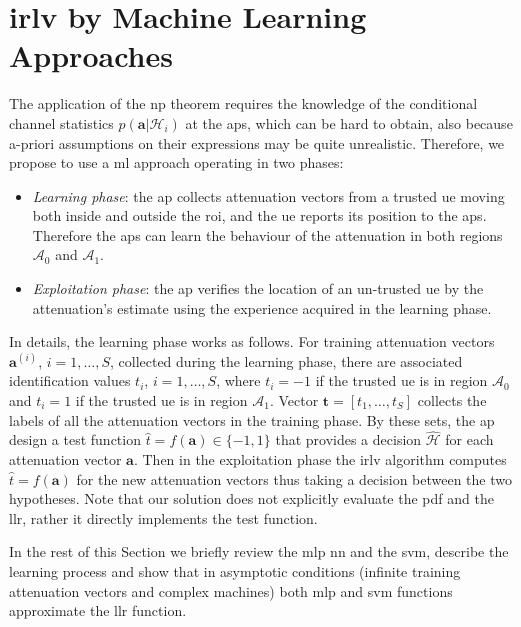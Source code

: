 \documentclass[draftcls,onecolumn,12pt]{IEEEtran}
\newcommand{\ai}{\bm{a}^{(i)}}
\begin{document}
\section{\Ac{irlv} by Machine Learning Approaches}


The application of the \ac{np} theorem requires the knowledge of the conditional channel statistics $p(\bm{a}|\mathcal{H}_i)$ at the \acp{ap}, which can be hard to obtain, also because a-priori assumptions on their expressions may be quite unrealistic. 
 Therefore, we propose to use a \ac{ml} approach operating in two phases:
\begin{itemize}
    \item {\em Learning phase}: the \ac{ap} collects attenuation vectors from a trusted \ac{ue} moving both inside and outside the \ac{roi}, and the \ac{ue} reports its position to the \acp{ap}. Therefore the \acp{ap} can learn the behaviour of the attenuation in both regions $\mathcal A_0$ and $\mathcal A_1$.
    \item {\em Exploitation phase}: the \ac{ap} verifies the location of an un-trusted \ac{ue} by the attenuation's estimate using the experience acquired in the learning phase. 
\end{itemize}

In details, the learning phase works as follows. For training attenuation vectors $\ai$,  $i=1, \ldots, S$,  collected during the learning phase, there are associated identification values $t_i$, $i=1, \ldots, S$, where $t_i= -1$ if the trusted \ac{ue} is in region $\mathcal{A}_0$ and $t_i = 1$ if the trusted \ac{ue} is in region $\mathcal{A}_1$. Vector $\bm{t}=[t_1, \ldots, t_S]$ collects the labels of all the  attenuation vectors in the training phase. By these sets, the \ac{ap} design a test function  $\hat{t} = f(\bm{a})\in \{-1, 1\}$ that provides a decision $\hat{\mathcal H}$ for each attenuation vector $\bm{a}$. Then in the exploitation phase the \ac{irlv} algorithm computes $\hat{t} = f(\bm{a})$ for the new attenuation vectors thus taking a decision between the two hypotheses. Note that our solution does not explicitly evaluate the \ac{pdf} and the \ac{llr}, rather it directly implements the test function.

In the rest of this Section we  briefly review the \ac{mlp} \ac{nn} and the \ac{svm}, describe the learning process  and show that in asymptotic conditions (infinite training attenuation vectors and complex machines) both \ac{mlp} and \ac{svm} functions approximate the \ac{llr} function.
  
\end{document}
